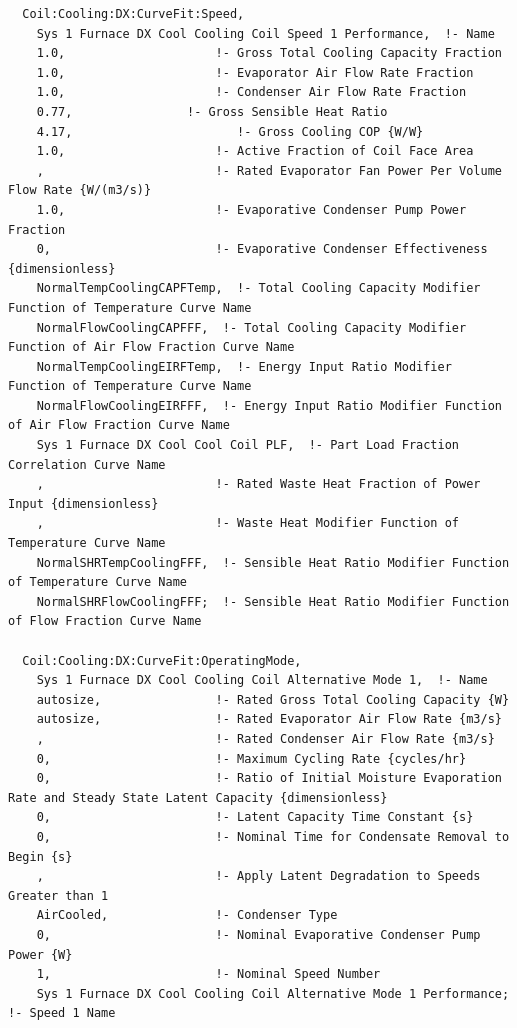 \begin{lstlisting}
  Coil:Cooling:DX:CurveFit:Speed,
    Sys 1 Furnace DX Cool Cooling Coil Speed 1 Performance,  !- Name
    1.0,                     !- Gross Total Cooling Capacity Fraction
    1.0,                     !- Evaporator Air Flow Rate Fraction
    1.0,                     !- Condenser Air Flow Rate Fraction
    0.77,                !- Gross Sensible Heat Ratio
    4.17,                       !- Gross Cooling COP {W/W}
    1.0,                     !- Active Fraction of Coil Face Area
    ,                        !- Rated Evaporator Fan Power Per Volume Flow Rate {W/(m3/s)}
    1.0,                     !- Evaporative Condenser Pump Power Fraction
    0,                       !- Evaporative Condenser Effectiveness {dimensionless}
    NormalTempCoolingCAPFTemp,  !- Total Cooling Capacity Modifier Function of Temperature Curve Name
    NormalFlowCoolingCAPFFF,  !- Total Cooling Capacity Modifier Function of Air Flow Fraction Curve Name
    NormalTempCoolingEIRFTemp,  !- Energy Input Ratio Modifier Function of Temperature Curve Name
    NormalFlowCoolingEIRFFF,  !- Energy Input Ratio Modifier Function of Air Flow Fraction Curve Name
    Sys 1 Furnace DX Cool Cool Coil PLF,  !- Part Load Fraction Correlation Curve Name
    ,                        !- Rated Waste Heat Fraction of Power Input {dimensionless}
    ,                        !- Waste Heat Modifier Function of Temperature Curve Name
    NormalSHRTempCoolingFFF,  !- Sensible Heat Ratio Modifier Function of Temperature Curve Name
    NormalSHRFlowCoolingFFF;  !- Sensible Heat Ratio Modifier Function of Flow Fraction Curve Name

  Coil:Cooling:DX:CurveFit:OperatingMode,
    Sys 1 Furnace DX Cool Cooling Coil Alternative Mode 1,  !- Name
    autosize,                !- Rated Gross Total Cooling Capacity {W}
    autosize,                !- Rated Evaporator Air Flow Rate {m3/s}
    ,                        !- Rated Condenser Air Flow Rate {m3/s}
    0,                       !- Maximum Cycling Rate {cycles/hr}
    0,                       !- Ratio of Initial Moisture Evaporation Rate and Steady State Latent Capacity {dimensionless}
    0,                       !- Latent Capacity Time Constant {s}
    0,                       !- Nominal Time for Condensate Removal to Begin {s}
    ,                        !- Apply Latent Degradation to Speeds Greater than 1
    AirCooled,               !- Condenser Type
    0,                       !- Nominal Evaporative Condenser Pump Power {W}
    1,                       !- Nominal Speed Number
    Sys 1 Furnace DX Cool Cooling Coil Alternative Mode 1 Performance;  !- Speed 1 Name


\end{lstlisting}
